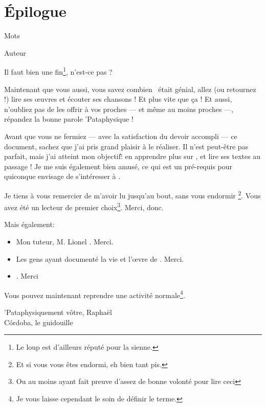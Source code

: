\backmatter
\chapter{Épilogue}
\epigraph{Mots}
{Auteur}
\vfill
\pagebreak

Il faut bien une fin\footnote{Le loup est d'ailleurs réputé pour la sienne.},
n'est-ce pas ?

Maintenant que vous aussi, vous
savez combien \BV\ était génial, allez (ou retournez !) lire ses
\oe{}uvres et écouter ses chansons ! Et plus vite que ça !
Et aussi, n'oubliez pas de les offrir à vos proches --- et même
au moins proches ---, répandez la bonne parole 'Pataphysique !


Avant que vous ne fermiez --- avec la satisfaction du devoir accompli --- ce document,
sachez que j'ai pris grand plaisir à le réaliser. Il n'est peut-être pas parfait,
mais j'ai atteint mon objectif\~: en apprendre plus sur \BV, et lire ses textes
au passage ! Je me suis également bien amusé, ce qui est un pré-requis pour
quiconque envisage de s'intéresser à \BV.

Je tiens à vous remercier de m'avoir lu jusqu'au bout, sans vous endormir
\footnote{Et si vous vous êtes endormi, eh bien tant pis.}. Vous avez été
un lecteur de premier choix\footnote{Ou au moins ayant fait preuve d'assez de
bonne volonté pour lire ceci}. Merci, donc.

Mais également:
\begin{itemize}
\item Mon tuteur, M. Lionel . Merci.
\item Les gens ayant documenté la vie et l'\oe{}vre de \BV. Merci.
\item \BV. Merci
\end{itemize}

Vous pouvez maintenant reprendre une activité normale\footnote{Je vous laisse
cependant le soin de définir le terme.}.

\vfill
\hfill 'Pataphysiquement vôtre,
\vskip 2cm
\hfill Raphaël\\
\hfill Córdoba, le  guidouille 
\vskip 2cm

\tableofcontents

